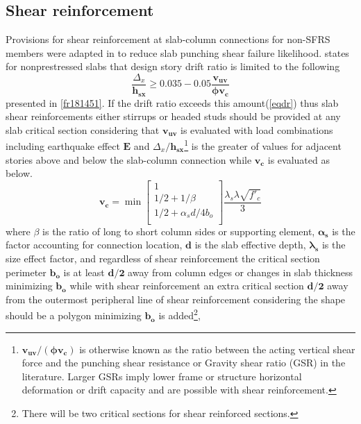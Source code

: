 \subsection{Shear reinforcement}
Provisions for shear reinforcement at slab-column connections for non-SFRS members were adapted in \cite{aci31805} to reduce slab punching shear failure likelihood. \citet[Section 18.14.5]{aci31819} states for nonprestressed slabs that design story drift ratio is limited to the following
\begin{equation}\label{eqdr}
\frac{\Delta_x}{\mathbf{h_{sx}}}\ge\mathbf{0.035-0.05\frac{v_{uv}}{\phi v_c}}
\end{equation}
presented in \ref{fr181451}.
If the drift ratio exceeds this amount(\ref{eqdr}) thus slab shear reinforcements either stirrups or headed studs should be provided at any slab critical section considering that $\mathbf{v_{uv}}$ is evaluated with load combinations including earthquake effect $\mathbf{E}$ and $\Delta_x/\mathbf{h_{sx}}$\footnote{$\mathbf{v_{uv}/(\phi v_c)}$ is otherwise known as the ratio between the acting vertical shear force and the punching shear resistance or Gravity shear ratio (GSR) in the literature. Larger GSRs imply lower frame or structure horizontal deformation or drift capacity and are possible with shear reinforcement\citep{gouveia2019}.} is the greater of values for adjacent stories above and below the slab-column connection while $\mathbf{v_c}$ is evaluated as below. 
\begin{equation}\label{eqt22652}
\mathbf{v_c} = \min{\left[\begin{array}{c}
1\\
1/2+{1}/{\beta}\\
1/2+{\alpha_sd}/{4b_o}\\
\end{array}\right]}
\frac{\lambda_s\lambda\sqrt{f'_c}}{3}
\end{equation}
where $\beta$ is the ratio of long to short column sides or supporting element, $\mathbf{\alpha_s}$ is the factor accounting for connection location, $\mathbf{d}$ is the slab effective depth, $\mathbf{\lambda_s}$ is the size effect factor, and regardless of shear reinforcement the critical section perimeter $\mathbf{b_o}$ is at least $\mathbf{d/2}$ away from column edges or changes in slab thickness minimizing $\mathbf{b_o}$ while with shear reinforcement an extra critical section $\mathbf{d/2}$ away from the outermost peripheral line of shear reinforcement considering the shape should be a polygon minimizing $\mathbf{b_o}$ is added\footnote{There will be two critical sections for shear reinforced sections.}, 
